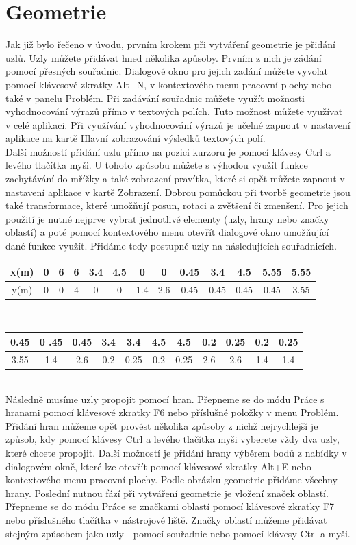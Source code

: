 \documentclass[a4paper, oneside]{article}
\begin{document}
\section{Geometrie}
Jak již bylo řečeno v úvodu, prvním krokem při vytváření geometrie je přidání uzlů. Uzly můžete přidávat hned několika způsoby. Prvním z nich je zádání pomocí přesných souřadnic. Dialogové okno pro jejich zadání můžete vyvolat pomocí klávesové zkratky Alt+N, v kontextového menu pracovní plochy nebo také v panelu Problém. Při zadávání souřadnic můžete využít možnosti vyhodnocování výrazů přímo v textových polích. Tuto možnost můžete využívat v celé aplikaci. Při využívání vyhodnocování výrazů je učelné zapnout v nastavení aplikace na kartě Hlavní zobrazování výsledků textových polí.\\
Další možností přidání uzlu přímo na pozici kurzoru je pomocí klávesy Ctrl a levého tlačítka myši. U tohoto způsobu můžete s výhodou využít funkce zachytávání do mřížky a také zobrazení pravítka, které si opět můžete zapnout v nastavení aplikace v kartě Zobrazení. Dobrou pomůckou při tvorbě geometrie jsou také transformace, které umožňují posun, rotaci a zvětšení či zmenšení. Pro jejich použití je nutné nejprve vybrat jednotlivé elementy (uzly, hrany nebo značky oblastí) a poté pomocí kontextového menu otevřít dialogové okno umožňující dané funkce využít. Přidáme tedy postupně uzly na následujících souřadnicích.\\
\begin{tabular}{|c|c|c|c|c|c|c|c|c|c|c|c|c|}
\hline
x(m) & 0 & 6 & 6 & 3.4 & 4.5 & 0 & 0 & 0.45 & 3.4 & 4.5 & 5.55 & 5.55\\
\hline
y(m) & 0 & 0 & 4 & 0 & 0 & 1.4 & 2.6 & 0.45 & 0.45 & 0.45 & 0.45 & 3.55\\
\hline 
\end{tabular} \\
\begin{tabular}{|c|c|c|c|c|c|c|c|c|c|c|}
\hline
 0.45 &0 .45 & 0.45 & 3.4 & 3.4 & 4.5 & 4.5 & 0.2 & 0.25 & 0.2 & 0.25\\
\hline
 3.55 & 1.4 & 2.6 & 0.2 & 0.25 & 0.2 & 0.25 & 2.6 & 2.6 & 1.4 & 1.4\\
\hline 
\end{tabular} \\
Následně musíme uzly propojit pomocí hran. Přepneme se do módu Práce s hranami pomocí klávesové zkratky F6 nebo příslušné položky v menu Problém. Přidání hran můžeme opět provést několika způsoby z nichž nejrychlejší je způsob, kdy pomocí klávesy Ctrl a levého tlačítka myši vyberete vždy dva uzly, které chcete propojit. Další možností je přidání hrany výběrem bodů z nabídky v dialogovém okně, které lze otevřít pomocí klávesové zkratky Alt+E nebo kontextového menu pracovní plochy. Podle obrázku geometrie přidáme všechny hrany. Poslední nutnou fází při vytváření geometrie je vložení značek oblastí. Přepneme se do módu Práce se značkami oblastí pomocí klávesové zkratky F7 nebo příslušného tlačítka v nástrojové liště. Značky oblastí můžeme přidávat stejným způsobem jako uzly - pomocí souřadnic nebo pomocí klávesy Ctrl a myši.\\
\end{document}
